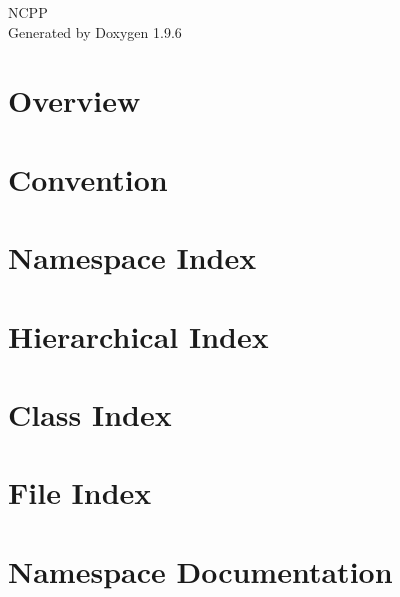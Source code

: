 \documentclass[twoside]{book}
\newcommand{\+}{\discretionary{\mbox{\scriptsize$\hookleftarrow$}}{}{}}
\newcommand{\clearemptydoublepage}{%
    \newpage{\pagestyle{empty}\cleardoublepage}%
  }
\begin{document}
  \raggedbottom
    \hypersetup{pageanchor=false,
                bookmarksnumbered=true,
                pdfencoding=unicode
               }
  \begin{titlepage}
  \vspace*{7cm}
  \begin{center}%
  {\Large NCPP}\\
  \vspace*{1cm}
  {\large Generated by Doxygen 1.9.6}\\
  \end{center}
  \end{titlepage}
  \clearemptydoublepage
  \tableofcontents
  \clearemptydoublepage
  \hypersetup{pageanchor=true}
\chapter{Overview}
\label{index}\hypertarget{index}{}
\chapter{Convention}
\label{md__f___n_coder__n_c_p_p_documentations_doxygen_markdown__convention}

\chapter{Namespace Index}

\chapter{Hierarchical Index}

\chapter{Class Index}

\chapter{File Index}

\chapter{Namespace Documentation}






\end{document}
